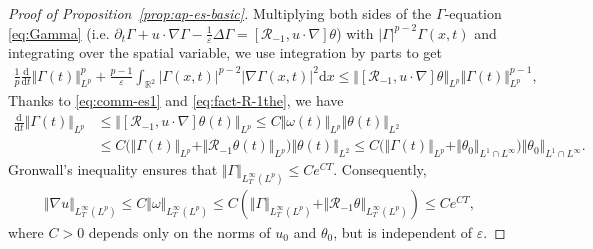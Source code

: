 \documentclass[reqno,11pt,a4paper]{amsart}
\newcommand{\RR}{\ensuremath{\mathcal{R}}}
\newcommand{\dd}{\mathrm{d}}
\begin{document}
\begin{proof}[Proof of Proposition~\ref{prop:ap-es-basic}]
Multiplying both sides of the $\Gamma$-equation \eqref{eq:Gamma} (i.e. $\partial_t\Gamma+u\cdot\nabla\Gamma-\frac1\varepsilon\Delta\Gamma=[\mathcal R_{-1}, u\cdot\nabla]\theta$) with $|\Gamma|^{p-2}\Gamma(x,t)$
and integrating over the spatial variable, we use integration by parts to get
\begin{align}\label{eq:Gam-Lp-es1a}
  \frac{1}{p} \frac{\dd}{\dd t} \Vert \Gamma(t)\Vert _{L^p}^p + \frac{p-1}{\varepsilon} \int_{\mathbb{R}^2} |\Gamma(x,t)|^{p-2}
  |\nabla\Gamma(x,t)|^2 \dd x \leq \Vert [\mathcal{R}_{-1}, u\cdot\nabla]\theta \Vert _{L^p} \Vert \Gamma(t)\Vert _{L^p}^{p-1},
\end{align}
Thanks to \eqref{eq:comm-es1} and \eqref{eq:fact-R-1the}, we have 
\begin{align*}%
  \frac{\dd}{\dd t}\Vert \Gamma(t)\Vert _{L^p} &\leq \Vert [\mathcal{R}_{-1}, u\cdot\nabla]\theta(t)\Vert _{L^p}\nonumber\leq C \Vert \omega(t)\Vert _{L^p}\Vert \theta(t)\Vert _{L^2}\\
  &\leq C \big(\Vert \Gamma(t)\Vert _{L^p} + \Vert \RR_{-1}\theta(t)\Vert _{L^p}\big) \Vert \theta(t)\Vert _{L^2}\leq C \big(\Vert \Gamma(t)\Vert _{L^p} + \Vert \theta_0\Vert _{L^1\cap L^\infty}\big) \Vert \theta_0\Vert _{L^1\cap L^\infty}.
\end{align*}
Gronwall's inequality ensures that $\Vert \Gamma\Vert _{L^\infty_T(L^p)}\leq C e^{CT}$. 
Consequently,
\begin{align}\label{eq:nab-u-Lp-es}
  \Vert \nabla u\Vert _{L^\infty_T(L^p)} \leq C \Vert \omega\Vert _{L^\infty_T(L^p)}
  \leq C \left(\Vert \Gamma\Vert _{L^\infty_T(L^p)} + \Vert \mathcal{R}_{-1} \theta\Vert _{L^\infty_T(L^p)} \right)
  \leq C e^{CT},
\end{align}
where $C>0$ depends only on the norms of $u_0$ and $\theta_0$, but is independent of $\varepsilon$.


\end{proof}
\end{document}
